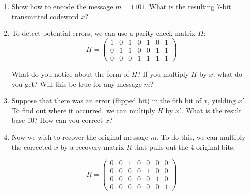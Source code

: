 \documentclass[11pt]{article}
\newif\ifsolutions
\begin{document}
\begin{enumerate}
\begin{enumerate}

\item Show how to encode the message $m=1101$.  What is the resulting 7-bit transmitted codeword $x$?
\vspace{15mm}

\ifsolutions 
\vspace{-15mm}
{\color{blue}{
\textbf{Solutions:} $Gm = x = 1010101$.
}}
\fi

\item To detect potential errors, we can use a parity check matrix $H$:
\[ H = \left( \begin{array}{ccccccc} 1 & 0 & 1 & 0 & 1 & 0 & 1 \\
0 & 1 & 1 & 0 & 0 & 1 & 1 \\
0 & 0 & 0 & 1 & 1 & 1 & 1
\end{array} \right)
\]

What do you notice about the form of $H$?  If you multiply $H$ by $x$, what do you get? Will this be true for any message $m$?
\vspace{10mm}

\ifsolutions 
\vspace{-10mm}
{\color{blue}{
\textbf{Solutions:} The columns of $H$ spell out the numbers 1-7 in binary (read bottom to top). $Hx = (0,0,0)$, which will be true for the encoding of any message $m$ with no errors.
}}
\fi

\item Suppose that there was an error (flipped bit) in the 6th bit of $x$, yielding $x'$. To find out where it occurred, we can multiply $H$ by $x'$. What is the result base 10? How can you correct $x$?
\vspace{15mm}

\ifsolutions 
\vspace{-15mm}
{\color{blue}{
\textbf{Solutions:} We actually received $x' = 1010111$. Computing $Hx'$, we get the sixth column of $H$, which corresponds to 6 in binary, so we know the 6th bit should be flipped to correct $x$.
}}
\fi

\item Now we wish to recover the original message $m$. To do this, we can multiply the corrected $x$ by a recovery matrix $R$ that pulls out the 4 original bits:

\[ R = \left( \begin{array}{ccccccc} 0 & 0 & 1 & 0 & 0 & 0 & 0 \\
0 & 0 & 0 & 0 & 1 & 0 & 0 \\
0 & 0 & 0 & 0 & 0 & 1 & 0 \\
0 & 0 & 0 & 0 & 0 & 0 & 1
\end{array} \right)
\]   


\end{enumerate}
\end{enumerate}
\end{document}
